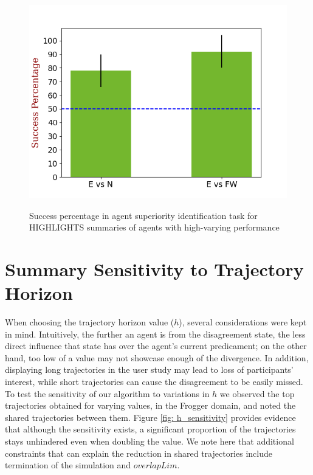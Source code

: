 \begin{figure}[ht]
	\centering
	\vspace{-0.4cm}
	\includegraphics[width=0.98\columnwidth]{images/success_easy_HL.png}\\
	\vspace{-0.7cm}
	\caption{Success percentage in agent superiority identification task for HIGHLIGHTS summaries of agents with high-varying performance}
	\label{fig: HL easy vote}
	\vspace{-0.2cm}
\end{figure}


\section{Summary Sensitivity to Trajectory Horizon}
When choosing the trajectory horizon value ($h$), several considerations were kept in mind.
Intuitively, the further an agent is from the disagreement state, the less direct influence that
state has over the agent's current predicament; on the other hand, too low of a value may not
showcase enough of the divergence. In addition, displaying long trajectories in the user study may
lead to loss of participants' interest, while short trajectories can cause the disagreement to be
easily missed. To test the sensitivity of our algorithm to variations in $h$ we observed the top
trajectories obtained for varying values, in the Frogger domain, and noted the shared trajectories between them.
Figure \ref{fig: h_sensitivity} provides evidence that although the sensitivity exists, a
significant proportion of the trajectories stays unhindered even when doubling the value. We note
here that additional constraints that can explain the reduction in shared trajectories include
termination of the simulation and $overlapLim$.

